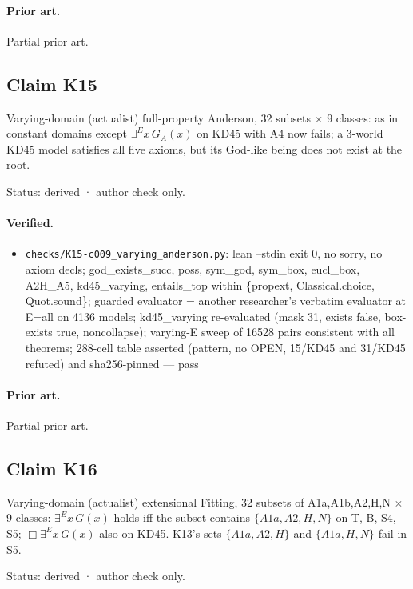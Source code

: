 \documentclass{article}
\begin{document}
\paragraph{Prior art.} Partial prior art.

\subsection*{Claim K15}

Varying-domain (actualist) full-property Anderson, 32 subsets $\times$ 9 classes: as in constant domains except $\exists^E x\,G_A(x)$ on KD45 with A4 now fails; a 3-world KD45 model satisfies all five axioms, but its God-like being does not exist at the root.

Status: derived · author check only.

\paragraph{Verified.}
\begin{itemize}
\item \texttt{checks/K15-c009\_varying\_anderson.py}: lean --stdin exit 0, no sorry, no axiom decls; god\_exists\_succ, poss, sym\_god, sym\_box, eucl\_box, A2H\_A5, kd45\_varying, entails\_top within \{propext, Classical.choice, Quot.sound\}; guarded evaluator = another researcher's verbatim evaluator at E=all on 4136 models; kd45\_varying re-evaluated (mask 31, exists false, box-exists true, noncollapse); varying-E sweep of 16528 pairs consistent with all theorems; 288-cell table asserted (pattern, no OPEN, 15/KD45 and 31/KD45 refuted) and sha256-pinned --- pass
\end{itemize}

\paragraph{Prior art.} Partial prior art.

\subsection*{Claim K16}

Varying-domain (actualist) extensional Fitting, 32 subsets of A1a,A1b,A2,H,N $\times$ 9 classes: $\exists^E x\,G(x)$ holds iff the subset contains $\{A1a,A2,H,N\}$ on T, B, S4, S5; $\Box\exists^E x\,G(x)$ also on KD45. K13's sets $\{A1a,A2,H\}$ and $\{A1a,H,N\}$ fail in S5.

Status: derived · author check only.
\end{document}
